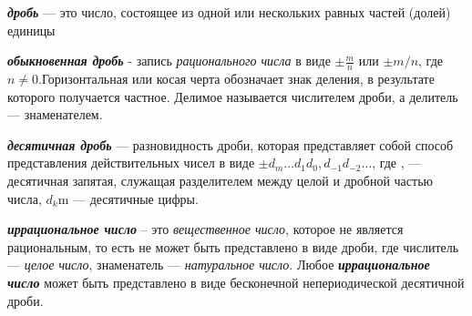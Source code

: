 \textbf{\textit{дробь}} — это число, состоящее из одной или нескольких равных частей (долей) единицы

\begin{SCn}
\end{SCn}

\textbf{\textit{обыкновенная дробь}} - запись \textit{рационального числа} в виде ${\displaystyle \pm {\frac {m}{n}}}$ или ${\pm m/n}$, где ${n\neq 0}$.Горизонтальная или косая черта обозначает знак деления, в результате которого получается частное. Делимое называется числителем дроби, а делитель — знаменателем.

\begin{SCn}
\end{SCn}

\textbf{\textit{десятичная дробь}} — разновидность дроби, которая представляет собой способ представления действительных чисел в виде ${\pm d_m \ldots d_1 d_0{,} d_{-1} d_{-2} \ldots}$, где , — десятичная запятая, служащая разделителем между целой и дробной частью числа, ${d_{k}}$m — десятичные цифры.

\begin{SCn}
\end{SCn}

\textbf{\textit{иррациональное число}} -- это \textit{вещественное число}, которое не является рациональным, то есть не может быть представлено в виде дроби, где числитель — \textit{целое число}, знаменатель — \textit{натуральное число}. Любое \textbf{\textit{иррациональное число}} может быть представлено в виде бесконечной непериодической десятичной дроби.

\begin{SCn}
\end{SCn}


\begin{SCn}
\end{SCn}

